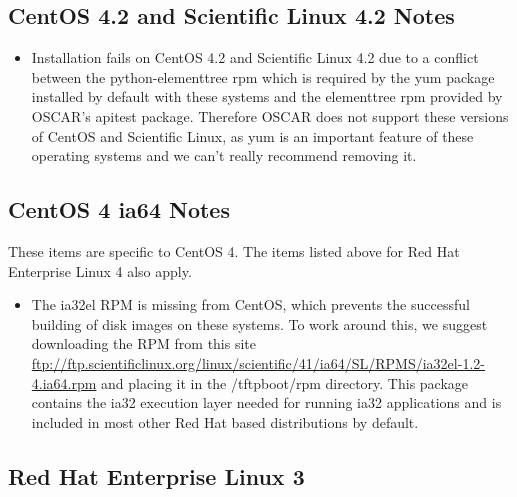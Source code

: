 \subsection{CentOS 4.2 and Scientific Linux 4.2 Notes}
\label{subsec:centos42sci42notes}

\begin{itemize}

\item Installation fails on CentOS 4.2 and Scientific Linux 4.2 due to
a conflict between the python-elementtree rpm which is required by the
yum package installed by default with these systems and the elementtree rpm
provided by OSCAR's apitest package.  Therefore OSCAR does not support
these versions of CentOS and Scientific Linux, as yum is an important
feature of these operating systems and we can't really recommend removing it.

\end{itemize}

\subsection{CentOS 4 ia64 Notes}
\label{subsec:centos4notes}

These items are specific to CentOS 4.  The items listed above for Red Hat
Enterprise Linux 4 also apply.

\begin{itemize}

\item The ia32el RPM is missing from CentOS, which prevents the successful
building of disk images on these systems.  To work around this, we suggest
downloading the RPM from this site \url{ftp://ftp.scientificlinux.org/linux/scientific/41/ia64/SL/RPMS/ia32el-1.2-4.ia64.rpm}
and placing it in the /tftpboot/rpm directory.  This package contains the
ia32 execution layer needed for running ia32 applications and is included
in most other Red Hat based distributions by default.

\end{itemize}


\subsection{Red Hat Enterprise Linux 3}
\label{subsec:rhel3notes}

